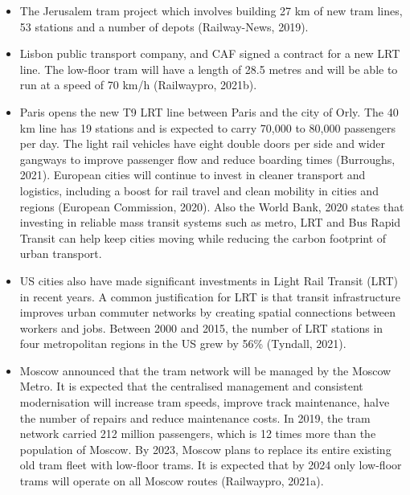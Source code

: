 \documentclass[
]{book}
\begin{document}
\begin{itemize}
\item
  The Jerusalem tram project which involves building 27 km of new tram lines, 53 stations and a number of depots (Railway-News, 2019).
\item
  Lisbon public transport company, and CAF signed a contract for a new LRT line. The low-floor tram will have a length of 28.5 metres and will be able to run at a speed of 70 km/h (Railwaypro, 2021b).
\item
  Paris opens the new T9 LRT line between Paris and the city of Orly. The 40 km line has 19 stations and is expected to carry 70,000 to 80,000 passengers per day. The light rail vehicles have eight double doors per side and wider gangways to improve passenger flow and reduce boarding times (Burroughs, 2021).
  European cities will continue to invest in cleaner transport and logistics, including a boost for rail travel and clean mobility in cities and regions (European Commission, 2020). Also the World Bank, 2020 states that investing in reliable mass transit systems such as metro, LRT and Bus Rapid Transit can help keep cities moving while reducing the carbon footprint of urban transport. 
\item
  US cities also have made significant investments in Light Rail Transit (LRT) in recent years. A common justification for LRT is that transit infrastructure improves urban commuter networks by creating spatial connections between workers and jobs. Between 2000 and 2015, the number of LRT stations in four metropolitan regions in the US grew by 56\% (Tyndall, 2021). 
\item
  Moscow announced that the tram network will be managed by the Moscow Metro. It is expected that the centralised management and consistent modernisation will increase tram speeds, improve track maintenance, halve the number of repairs and reduce maintenance costs. In 2019, the tram network carried 212 million passengers, which is 12 times more than the population of Moscow. By 2023, Moscow plans to replace its entire existing old tram fleet with low-floor trams. It is expected that by 2024 only low-floor trams will operate on all Moscow routes (Railwaypro, 2021a). 
\end{itemize}
\end{document}
